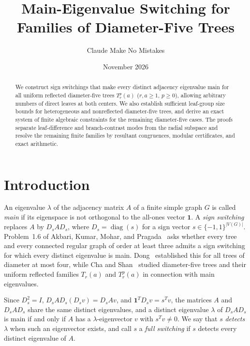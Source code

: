 \documentclass[11pt]{article}
\title{Main-Eigenvalue Switching for Families of Diameter-Five Trees}
\author{Claude Make No Mistakes}
\date{November 2026}
\theoremstyle{plain}
\theoremstyle{remark}
\DeclareMathOperator{\diag}{diag}
\begin{document}
\maketitle

\begin{abstract}
We construct sign switchings that make every distinct adjacency eigenvalue main
for all uniform reflected diameter-five trees $T_r^p(a)$ ($r,a\geq 1$,
$p\geq 0$), allowing arbitrary numbers of direct leaves at both centers. We
also establish sufficient leaf-group size bounds for heterogeneous and
nonreflected diameter-five trees, and derive an exact system of finite
algebraic constraints for the remaining diameter-five cases. The proofs
separate leaf-difference and branch-contrast modes from the radial subspace and
resolve the remaining finite families by resultant congruences, modular
certificates, and exact arithmetic.
\end{abstract}

\section{Introduction}\label{sec:intro}

An eigenvalue $\lambda$ of the adjacency matrix $A$ of a finite simple graph
$G$ is called \emph{main} if its eigenspace is not orthogonal to the all-ones
vector $\mathbf{1}$. A \emph{sign switching} replaces $A$ by
$D_s A D_s$, where $D_s = \diag(s)$ for a sign vector
$s \in \{-1,1\}^{|V(G)|}$. Problem~1.6 of Akbari, Kumar, Mohar, and
Pragada~\cite{AKMP} asks whether every tree and every connected regular graph
of order at least three admits a sign switching for which every distinct
eigenvalue is main. Dong~\cite{Dong} established this for all trees of diameter
at most four, while Cha and Shan~\cite{ChaShan} studied diameter-five trees
and their uniform reflected families $T_r(a)$ and $T_r^p(a)$ in connection with
main eigenvalues.

Since $D_s^2 = I$, $D_s A D_s (D_s v) = D_s A v$, and
$\mathbf{1}^T D_s v = s^T v$, the matrices $A$ and $D_s A D_s$ share the same
distinct eigenvalues, and a distinct eigenvalue $\lambda$ of $D_s A D_s$ is main
if and only if $A$ has a $\lambda$-eigenvector $v$ with $s^T v \neq 0$. We say
that $s$ \emph{detects} $\lambda$ when such an eigenvector exists, and call $s$
a \emph{full switching} if $s$ detects every distinct eigenvalue of $A$.
\end{document}

